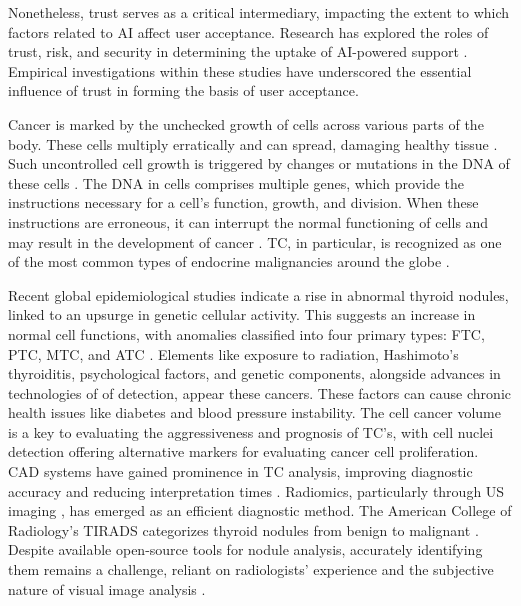 \documentclass[a4paper,fleqn]{cas-sc}
\begin{document}
Nonetheless, trust serves as a critical intermediary, impacting the extent to which factors related to \ac{AI} affect user acceptance. Research has explored the roles of trust, risk, and security in determining the uptake of \ac{AI}-powered support \cite{calisto2022modeling}. Empirical investigations within these studies have underscored the essential influence of trust in forming the basis of user acceptance.

Cancer is marked by the unchecked growth of cells across various parts of the body. These cells multiply erratically and can spread, damaging healthy tissue \cite{bechar2023harenessing}. Such uncontrolled cell growth is triggered by changes or mutations in the DNA of these cells \cite{habchi2023ai}. The DNA in cells comprises multiple genes, which provide the instructions necessary for a cell's function, growth, and division. When these instructions are erroneous, it can interrupt the normal functioning of cells and may result in the development of cancer \cite{dabbagh2022application, arunachalam2021study, atlihan2020recent, salem2023cancer}. \ac{TC}, in particular, is recognized as one of the most common types of endocrine malignancies around the globe \cite{deng2020global, hammouda2006registre}.





Recent global epidemiological studies indicate a rise in abnormal thyroid nodules, linked to an upsurge in genetic cellular activity. This suggests an increase in normal cell functions, with anomalies classified into four primary types: \ac{FTC}, \ac{PTC}, \ac{MTC}, and \ac{ATC} \cite{castellana2020can,hitu2020microrna,giovanella2020eanm,ferrari2020novel}. Elements like exposure to radiation, Hashimoto's thyroiditis, psychological factors, and genetic components, alongside advances in technologies of of detection, appear these cancers. These factors can cause chronic health issues like diabetes and blood pressure instability. The cell cancer volume is a key to evaluating the aggressiveness and prognosis of \ac{TC}'s, with cell nuclei detection offering alternative markers for evaluating cancer cell proliferation. \Ac{CAD} systems have gained prominence in \ac{TC} analysis, improving diagnostic accuracy and reducing interpretation times \cite{jin2020ultrasound,khammari2023high}. Radiomics, particularly through \ac{US} imaging \cite{hamza2023hybrid}, has emerged as an efficient diagnostic method. The American College of Radiology's \ac{TIRADS} categorizes thyroid nodules from benign to malignant \cite{tessler2017acr, tessler2018thyroid, ABCD1}. Despite available open-source tools for nodule analysis, accurately identifying them remains a challenge, reliant on radiologists' experience and the subjective nature of visual image analysis \cite{zhou2020differential}.
\end{document}
